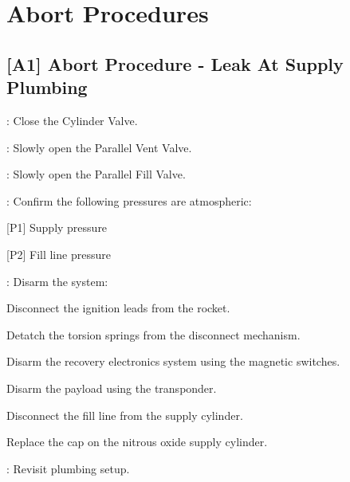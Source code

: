 \newpage
    
\section{Abort Procedures} 
\subsection{[A1] Abort Procedure - Leak At Supply Plumbing}
\begin{checklist}
    \item \primary{}: Close the Cylinder Valve.
    \item \primary{}: Slowly open the Parallel Vent Valve.
    \item \primary{}: Slowly open the Parallel Fill Valve.
    \item \control{}: Confirm the following pressures are atmospheric:
    \begin{checklist}
        \item {[P1]} Supply pressure
        \item {[P2]} Fill line pressure
    \end{checklist}
    \item \primary{}: Disarm the system:
        \begin{checklist}    
            \item Disconnect the ignition leads from the rocket.
            \item Detatch the torsion springs from the disconnect mechanism.
            \item Disarm the recovery electronics system using the magnetic switches.
            \item Disarm the payload using the transponder.
            \item Disconnect the fill line from the supply cylinder.
            \item Replace the cap on the nitrous oxide supply cylinder.
        \end{checklist}
    \item \ops{}: Revisit plumbing setup.
\end{checklist}
\setcounter{checklistnum}{0}

